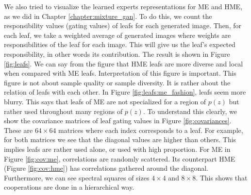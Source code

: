 \documentclass[a4paper,onesided,12pt]{report}
\begin{document}
We also tried to visualize the learned experts representations for ME and HME, as we did in Chapter \ref{chapter:mixture_gan}. To do this, we count the responsibility values (gating values) of leafs for each generated image. Then, for each leaf, we take a weighted average of generated images where weights are responsibilities of the leaf for each image. This will give us the leaf's expected responsibility, in other words its contribution. The result is shown in Figure \ref{fig:leafs}. We can say from the figure that HME leafs are more diverse and local when compared with ME leafs. Interpretation of this figure is important. This figure is not about sample quality or sample diversity. It is rather about the relation of leafs with each other. In Figure \ref{fig:leafs:me_fashion}, leafs seem more blurry. This says that leafs of ME are not specialized for a region of $p(z)$ but rather used throughout many regions of $p(z)$. To understand this clearly, we show the covariance matrices of leaf gating values in Figure \ref{fig:covariances}. These are $64 \times 64$ matrices where each index corresponds to a leaf. For example, for both matrices we see that the diagonal values are higher than others. This implies leafs are rather used alone, or used with high proportion. For ME in Figure \ref{fig:cov:me}, correlations are randomly scattered. Its counterpart HME (Figure \ref{fig:cov:hme}) has correlations gathered around the diagonal. Furthermore, we can see spectral squares of sizes $4 \times 4$ and $8 \times 8$. This shows that cooperations are done in a hierarchical way.
\end{document}
